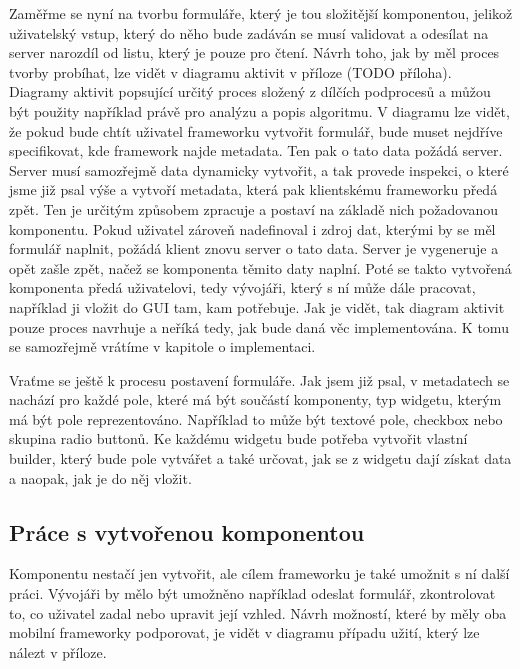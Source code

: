 Zaměřme se nyní na tvorbu formuláře, který je tou složitější komponentou, jelikož uživatelský vstup, který do něho bude zadáván se musí validovat a odesílat na server narozdíl od listu, který je pouze pro čtení. Návrh toho, jak by měl proces tvorby probíhat, lze vidět v diagramu aktivit v příloze (TODO příloha). Diagramy aktivit popsující určitý proces složený z dílčích podprocesů a můžou být použity například právě pro analýzu a popis algoritmu. V diagramu lze vidět, že pokud bude chtít uživatel frameworku vytvořit formulář, bude muset nejdříve specifikovat, kde framework najde metadata. Ten pak o tato data požádá server. Server musí samozřejmě data dynamicky vytvořit, a tak provede inspekci, o které jsme již psal výše a vytvoří metadata, která pak klientskému frameworku předá zpět. Ten je určitým způsobem zpracuje a postaví na základě nich požadovanou komponentu. Pokud uživatel zároveň nadefinoval i zdroj dat, kterými by se měl formulář naplnit, požádá klient znovu server o tato data. Server je vygeneruje a opět zašle zpět, načež se komponenta těmito daty naplní. Poté se takto vytvořená komponenta předá uživatelovi, tedy vývojáři, který s ní může dále pracovat, například ji vložit do GUI tam, kam potřebuje. Jak je vidět, tak diagram aktivit pouze proces navrhuje a neříká tedy, jak bude daná věc implementována. K tomu se samozřejmě vrátíme v kapitole o implementaci. 

Vraťme se ještě k procesu postavení formuláře. Jak jsem již psal, v metadatech se nachází pro každé pole, které má být součástí komponenty, typ widgetu, kterým má být pole reprezentováno. Například to může být textové pole, checkbox nebo skupina radio buttonů. Ke každému widgetu bude potřeba vytvořit vlastní builder, který bude pole vytvářet a také určovat, jak se z widgetu dají získat data a naopak, jak je do něj vložit. 

\subsection{Práce s vytvořenou komponentou}
Komponentu nestačí jen vytvořit, ale cílem frameworku je také umožnit s ní další práci. Vývojáři by mělo být umožněno například odeslat formulář, zkontrolovat to, co uživatel zadal nebo upravit její vzhled. Návrh možností, které by měly oba mobilní frameworky podporovat, je vidět v diagramu případu užití, který lze nálezt v příloze. 
